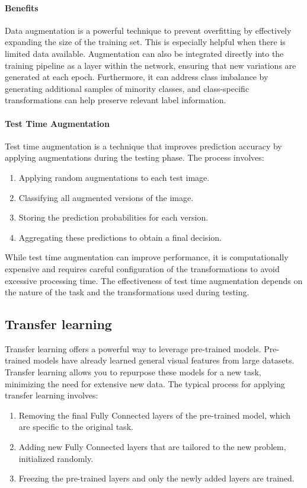 \paragraph*{Benefits}
Data augmentation is a powerful technique to prevent overfitting by effectively expanding the size of the training set. 
This is especially helpful when there is limited data available. 
Augmentation can also be integrated directly into the training pipeline as a layer within the network, ensuring that new variations are generated at each epoch. 
Furthermore, it can address class imbalance by generating additional samples of minority classes, and class-specific transformations can help preserve relevant label information.

\paragraph*{Test Time Augmentation}
Test time augmentation is a technique that improves prediction accuracy by applying augmentations during the testing phase.
The process involves:
\begin{enumerate}
    \item Applying random augmentations to each test image.
    \item Classifying all augmented versions of the image.
    \item Storing the prediction probabilities for each version.
    \item Aggregating these predictions to obtain a final decision.
\end{enumerate}
While test time augmentation can improve performance, it is computationally expensive and requires careful configuration of the transformations to avoid excessive processing time. 
The effectiveness of test time augmentation depends on the nature of the task and the transformations used during testing.

\subsection{Transfer learning}
Transfer learning offers a powerful way to leverage pre-trained models.
Pre-trained models have already learned general visual features from large datasets.
Transfer learning allows you to repurpose these models for a new task, minimizing the need for extensive new data. 
The typical process for applying transfer learning involves:
\begin{enumerate} 
    \item Removing the final Fully Connected layers of the pre-trained model, which are specific to the original task.
    \item Adding new Fully Connected layers that are tailored to the new problem, initialized randomly.
    \item Freezing the pre-trained layers and only the newly added layers are trained.
\end{enumerate}

